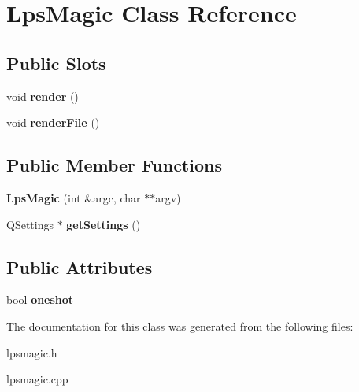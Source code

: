 \hypertarget{classLpsMagic}{
\section{\-Lps\-Magic \-Class \-Reference}
\label{classLpsMagic}
}
\subsection*{\-Public \-Slots}
\begin{DoxyCompactItemize}
\item 
\hypertarget{classLpsMagic_a6e5cfcb4a9001e0f6147554bccb27166}{
void {\bfseries render} ()}
\label{classLpsMagic_a6e5cfcb4a9001e0f6147554bccb27166}

\item 
\hypertarget{classLpsMagic_a360d9ccbc18fdb4ea64411a2749daced}{
void {\bfseries render\-File} ()}
\label{classLpsMagic_a360d9ccbc18fdb4ea64411a2749daced}

\end{DoxyCompactItemize}
\subsection*{\-Public \-Member \-Functions}
\begin{DoxyCompactItemize}
\item 
\hypertarget{classLpsMagic_a4feebb734e1cb09af2a12cd240fa79f8}{
{\bfseries \-Lps\-Magic} (int \&argc, char $\ast$$\ast$argv)}
\label{classLpsMagic_a4feebb734e1cb09af2a12cd240fa79f8}

\item 
\hypertarget{classLpsMagic_acb88975f264f42b65851c16245c855be}{
\-Q\-Settings $\ast$ {\bfseries get\-Settings} ()}
\label{classLpsMagic_acb88975f264f42b65851c16245c855be}

\end{DoxyCompactItemize}
\subsection*{\-Public \-Attributes}
\begin{DoxyCompactItemize}
\item 
\hypertarget{classLpsMagic_abe89170e927f7abd939de666578d8e61}{
bool {\bfseries oneshot}}
\label{classLpsMagic_abe89170e927f7abd939de666578d8e61}

\end{DoxyCompactItemize}


\-The documentation for this class was generated from the following files\-:\begin{DoxyCompactItemize}
\item 
lpsmagic.\-h\item 
lpsmagic.\-cpp\end{DoxyCompactItemize}
